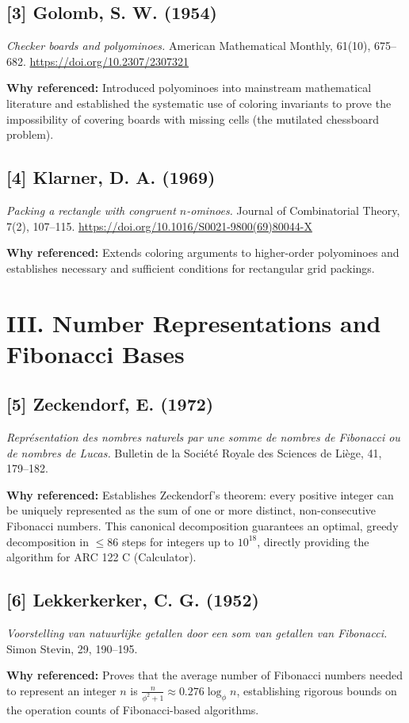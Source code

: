 \documentclass[11pt]{article}
\begin{document}
\subsection*{[3] Golomb, S. W. (1954)}
\textit{Checker boards and polyominoes.}
American Mathematical Monthly, 61(10), 675--682.
\url{https://doi.org/10.2307/2307321}

\textbf{Why referenced:}
Introduced polyominoes into mainstream mathematical literature and established the systematic use of coloring invariants to prove the impossibility of covering boards with missing cells (the mutilated chessboard problem).

\vspace{1em}

\subsection*{[4] Klarner, D. A. (1969)}
\textit{Packing a rectangle with congruent $n$-ominoes.}
Journal of Combinatorial Theory, 7(2), 107--115.
\url{https://doi.org/10.1016/S0021-9800(69)80044-X}

\textbf{Why referenced:}
Extends coloring arguments to higher-order polyominoes and establishes necessary and sufficient conditions for rectangular grid packings.

\section*{III. Number Representations and Fibonacci Bases}

\subsection*{[5] Zeckendorf, E. (1972)}
\textit{Repr{\'e}sentation des nombres naturels par une somme de nombres de Fibonacci ou de nombres de Lucas.}
Bulletin de la Soci{\'e}t{\'e} Royale des Sciences de Li{\`e}ge, 41, 179--182.

\textbf{Why referenced:}
Establishes Zeckendorf's theorem: every positive integer can be uniquely represented as the sum of one or more distinct, non-consecutive Fibonacci numbers. This canonical decomposition guarantees an optimal, greedy decomposition in $\le 86$ steps for integers up to $10^{18}$, directly providing the algorithm for ARC 122 C (Calculator).

\vspace{1em}

\subsection*{[6] Lekkerkerker, C. G. (1952)}
\textit{Voorstelling van natuurlijke getallen door een som van getallen van Fibonacci.}
Simon Stevin, 29, 190--195.

\textbf{Why referenced:}
Proves that the average number of Fibonacci numbers needed to represent an integer $n$ is $\frac{n}{\phi^2 + 1} \approx 0.276 \log_\phi n$, establishing rigorous bounds on the operation counts of Fibonacci-based algorithms.
\end{document}
